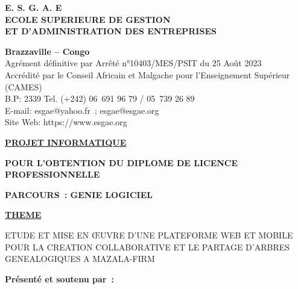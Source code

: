 \begin{titlepage}
  \begin{center}
  \vspace*{\fill}

    \large {
      \textbf{
        E. S. G. A. E \\
        ECOLE SUPERIEURE DE GESTION \\
        ET D’ADMINISTRATION DES ENTREPRISES \\
      }
    }

    \vspace{0.2cm}

    \large {
      \textbf{ Brazzaville – Congo } \\
      Agrément définitive par Arrêté n°10403/MES/PSIT du 25 Août 2023 \\
      Accrédité par le Conseil Africain et Malgache pour l’Enseignement Supérieur (CAMES) \\
      B.P: 2339 Tel. (+242) 06 691 96 79 / 05 739 26 89 \\
      E-mail: esgae@yahoo.fr ; esgae@esgae.org \\
      Site Web: https://www.esgae.org \\
    }

    \vspace{1.5cm}

    \large {
      \textbf { \underline {PROJET INFORMATIQUE} }
    }

    \vspace{0.2cm}
    \large {
      \textbf{POUR L’OBTENTION DU DIPLOME DE LICENCE PROFESSIONNELLE}
    }

    \vspace{0.2cm}
    \large {
      \textbf{PARCOURS : GENIE LOGICIEL}
    }

    \vspace{1.5cm}

    \normalsize {
      \textbf { \underline {THEME} }
    }

    \vspace{0.2cm}
    \large {
      ETUDE ET MISE EN ŒUVRE D’UNE PLATEFORME WEB ET MOBILE POUR LA CREATION COLLABORATIVE ET LE PARTAGE D’ARBRES GENEALOGIQUES A MAZALA-FIRM
    }
  \end{center}

  \vspace{1.5cm}

  \begin{flushleft}
    \large {
      \textbf {
        Présenté et soutenu par : \\
        \projetauthor
      }
    }
  \end{flushleft}


\end{titlepage}
